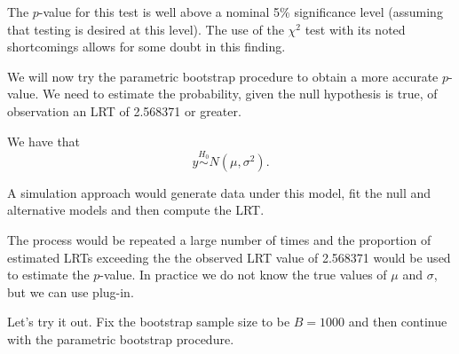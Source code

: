 \documentclass[
  ignorenonframetext,
]{beamer}
\begin{document}
\begin{frame}{}
\protect\hypertarget{section-5}{}
The \(p\)-value for this test is well above a nominal 5\% significance
level (assuming that testing is desired at this level). The use of the
\(\chi^2\) test with its noted shortcomings allows for some doubt in
this finding.

We will now try the parametric bootstrap procedure to obtain a more
accurate \(p\)-value. We need to estimate the probability, given the
null hypothesis is true, of observation an LRT of 2.568371 or greater.

We have that \[
  y \overset{H_0}{\sim} N(\mu,\sigma^2).
\]
\end{frame}

\begin{frame}{}
\protect\hypertarget{section-6}{}
A simulation approach would generate data under this model, fit the null
and alternative models and then compute the LRT.

The process would be repeated a large number of times and the proportion
of estimated LRTs exceeding the the observed LRT value of 2.568371 would
be used to estimate the \(p\)-value. In practice we do not know the true
values of \(\mu\) and \(\sigma\), but we can use plug-in.

Let's try it out. Fix the bootstrap sample size to be \(B = 1000\) and
then continue with the parametric bootstrap procedure.
\end{frame}
\end{document}
